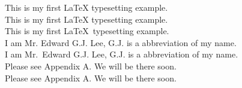\documentclass{report}
\begin{document}
   This is my first {\LaTeX} typesetting example.\\
   This is my first \LaTeX{} typesetting example.\\
   This is my first \LaTeX\ typesetting example.\\
   I am Mr. Edward G.J. Lee, G.J. is a abbreviation of my name.\\
   I am Mr.\ Edward G.J. Lee, G.J. is a abbreviation of my name.\\
   Please see Appendix A. We will be there soon.\\
   Please see Appendix A\null. We will be there soon.
   
\end{document}
